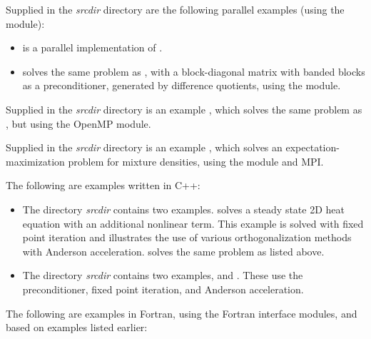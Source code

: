 \vspace{0.2in}\noindent
Supplied in the {\em srcdir} directory are
the following parallel examples (using the {\nvecp} module):
\begin{itemize}
\item {}
  is a parallel implementation of .
\item {}
  solves the same problem as , with a block-diagonal matrix
  with banded blocks as a preconditioner, generated by difference quotients,
  using the {\kinbbdpre} module.
\end{itemize}

\vspace{0.2in}\noindent
Supplied in the {\em srcdir} directory
is an example , which solves the same problem
as , but using the OpenMP {\nvector} module.

\vspace{0.2in}\noindent
Supplied in the {\em srcdir} directory
is an example , which solves an
expectation-maximization problem for mixture densities, using the
 {\nvector} module and MPI.

\vspace{0.2in}\noindent 
The following are examples written in C++:
\begin{itemize}

\item The directory {\em srcdir}
  contains two examples.  solves a
  steady state 2D heat equation with an additional nonlinear term.
  This example is solved with fixed point iteration and illustrates
  the use of various orthogonalization methods with Anderson
  acceleration.
   solves the same problem as 
  listed above.

\item The directory {\em srcdir}
  contains two examples,  and
  .  These use the 
   preconditioner, fixed point iteration, and Anderson
  acceleration.

\end{itemize}
  
\vspace{0.2in}\noindent
The following are examples in Fortran, using the {\sundials}
Fortran interface modules, and based on examples listed earlier:

